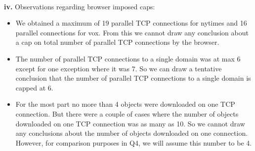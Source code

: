 \documentclass[12pt]{article}
\begin{document}
~\\
\textbf{iv.} Observations regarding browser imposed caps:
\begin{itemize}
\item We obtained a maximum of 19 parallel TCP connections for nytimes and 16 parallel connections for vox. From this we cannot draw any conclusion about a cap on total number of parallel TCP connections by the browser. 
\item The number of parallel TCP connections to a single domain was at max 6 except for one exception where it was 7. So we can draw a tentative conclusion that the number of parallel TCP connections to a single domain is capped at 6.
\item For the most part no more than 4 objects were downloaded on one TCP connection. But there were a couple of cases where the number of objects downloaded on one TCP connection was as many as 10. So we cannot draw any conclusions about the number of objects downloaded on one connection. However, for comparison purposes in Q4, we will assume this number to be 4. 
\end{itemize}
\end{document}
